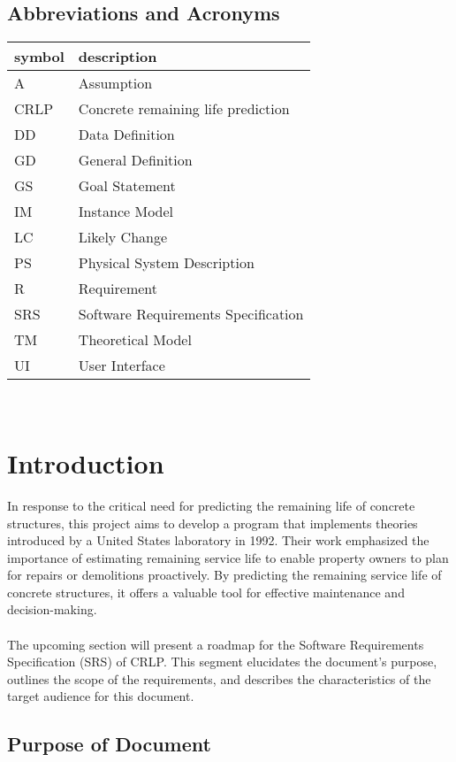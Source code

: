 \documentclass[12pt]{article}
\begin{document}
\subsection{Abbreviations and Acronyms}

\renewcommand{\arraystretch}{1.2}
\begin{tabular}{l l} 
  \toprule		
  \textbf{symbol} & \textbf{description}\\
  \midrule 
  A & Assumption\\
  CRLP & Concrete remaining life prediction \\
  DD & Data Definition\\  
  GD & General Definition\\
  GS & Goal Statement\\
  IM & Instance Model\\
  LC & Likely Change\\
  PS & Physical System Description\\
  R & Requirement\\
  SRS & Software Requirements Specification\\
  TM & Theoretical Model\\
  UI & User Interface \\
  \bottomrule
\end{tabular}\\



\section{Introduction}
In response to the critical need for predicting the remaining life of concrete structures, this project aims to develop a program that implements theories introduced by a United States laboratory in 1992. \cite{concrete_life_1992} Their work emphasized the importance of estimating remaining service life to enable property owners to plan for repairs or demolitions proactively. By predicting the remaining service life of concrete structures, it offers a valuable tool for effective maintenance and decision-making. \\
\\
The upcoming section will present a roadmap for the Software Requirements Specification (SRS) of CRLP. This segment elucidates the document's purpose, outlines the scope of the requirements, and describes the characteristics of the target audience for this document.

\subsection{Purpose of Document}
\end{document}

